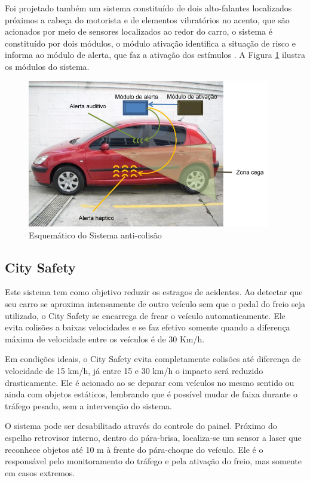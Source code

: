  Foi projetado também um sistema constituído de dois alto-falantes localizados próximos a cabeça do motorista e de elementos vibratórios no
 acento, que são acionados por meio de sensores localizados ao redor do carro, o sistema é constituído por dois módulos, o módulo ativação
 identifica a situação de risco e informa ao módulo de alerta, que faz a ativação dos estímulos \cite{usp}. A Figura \ref{fig:sistemaanticolisao} ilustra os módulos do sistema.


  \begin{figure}[h]
    \centering
    \includegraphics[width=400px, scale=0.5]{figuras/sistemaanticolisao}
    \caption{Esquemático do Sistema anti-colisão}
    \label{fig:sistemaanticolisao}
  \end{figure}

\subsection{City Safety}
Este sistema tem como objetivo reduzir os estragos de acidentes. Ao detectar que seu carro se aproxima intensamente de outro veículo sem que o pedal do freio seja utilizado, o City Safety se encarrega de frear o veículo automaticamente. Ele evita colisões a baixas velocidades e se faz efetivo somente quando a diferença máxima de velocidade entre os veículos é de 30 Km/h.

Em condições ideais, o City Safety evita completamente colisões até diferença de velocidade de 15 km/h, já entre 15 e 30 km/h o impacto será reduzido drasticamente. Ele é acionado ao se deparar com veículos no mesmo sentido ou ainda com objetos estáticos, lembrando que é possível mudar de faixa durante o tráfego pesado, sem a intervenção do sistema.

O sistema pode ser desabilitado através do controle do painel. Próximo do espelho retrovisor interno, dentro do pára-brisa, localiza-se um sensor a laser que reconhece objetos até 10 m à frente do pára-choque do veículo. Ele é o responsável pelo monitoramento do tráfego e pela ativação do freio, mas somente em casos extremos.

